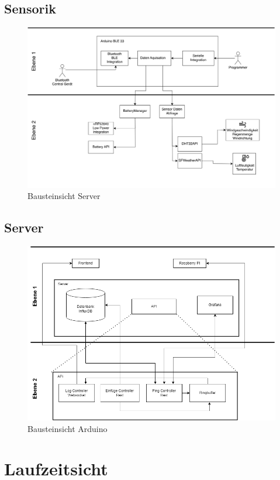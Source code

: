 \documentclass[
]{article}
\begin{document}
\subsection{Sensorik}
\begin{figure}[htbp]
	\centering
	\includegraphics[width=130mm]{resources/Bausteinschicht_Sara.png}
	\caption{Bausteinsicht Server}
	\label{fig:ContextDiagram}
\end{figure}  
\subsection{Server}
\begin{figure}[htbp]
	\centering
	\includegraphics[width=130mm]{resources/Bausteinsicht_Server.png}
	\caption{Bausteinsicht Arduino}
	\label{fig:ContextDiagram}
\end{figure}  

\section{Laufzeitsicht}
\end{document}
